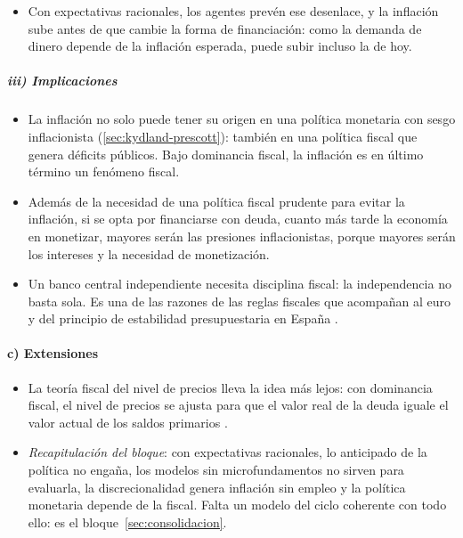 \documentclass[11pt]{article}
\begin{document}
\begin{itemize}
\begin{enumerate}[label=\alph*)]
\begin{itemize}
    \item pero ese recurso al señoreaje llega cuando la deuda es mucho mayor que al principio, lo que obliga a crear más dinero y a una inflación mayor que si se hubiera monetizado desde el principio.
    \end{itemize}
  \end{enumerate}
\item Con expectativas racionales, los agentes prevén ese desenlace, y la inflación sube antes de que cambie la forma de financiación: como la demanda de dinero depende de la inflación esperada, puede subir incluso la de hoy.
\end{itemize}

\subparagraph{iii) Implicaciones}

\begin{itemize}
\item La inflación no solo puede tener su origen en una política monetaria con sesgo inflacionista (\ref{sec:kydland-prescott}): también en una política fiscal que genera déficits públicos. Bajo dominancia fiscal, la inflación es en último término un fenómeno fiscal.
\item Además de la necesidad de una política fiscal prudente para evitar la inflación, si se opta por financiarse con deuda, cuanto más tarde la economía en monetizar, mayores serán las presiones inflacionistas, porque mayores serán los intereses y la necesidad de monetización.
\item Un banco central independiente necesita disciplina fiscal: la independencia no basta sola. Es una de las razones de las reglas fiscales que acompañan al euro y del principio de estabilidad presupuestaria en España .
\end{itemize}

\paragraph{c) Extensiones}

\begin{itemize}
\item La teoría fiscal del nivel de precios lleva la idea más lejos: con dominancia fiscal, el nivel de precios se ajusta para que el valor real de la deuda iguale el valor actual de los saldos primarios\nocite{Leeper1991} .
\item \emph{Recapitulación del bloque}: con expectativas racionales, lo anticipado de la política no engaña, los modelos sin microfundamentos no sirven para evaluarla, la discrecionalidad genera inflación sin empleo y la política monetaria depende de la fiscal. Falta un modelo del ciclo coherente con todo ello: es el bloque~\ref{sec:consolidacion}.
\end{itemize}
\end{document}
